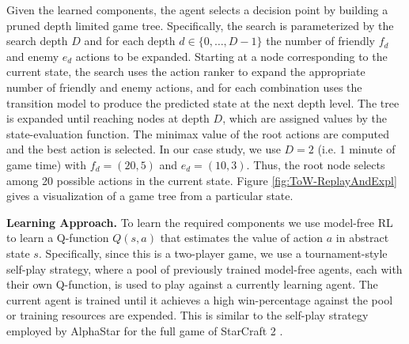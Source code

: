 \documentclass{article}
\begin{document}
Given the learned components, the agent selects a decision point by building a pruned depth limited game tree. Specifically, the search is parameterized by the search depth $D$ and for each depth $d\in \{0,\ldots, D-1\}$ the number of friendly $f_d$ and enemy $e_d$ actions to be expanded. Starting at a node corresponding to the current state, the search uses the action ranker to expand the appropriate number of friendly and enemy actions, and for each combination uses the transition model to produce the predicted state at the next depth level. The tree is expanded until reaching nodes at depth $D$, which are assigned values by the state-evaluation function. The minimax value of the root actions are computed and the best action is selected. In our case study, we use $D=2$ (i.e. 1 minute of game time) with $f_d = (20, 5)$ and $e_d = (10, 3)$. Thus, the root node selects among 20 possible actions in the current state. Figure \ref{fig:ToW-ReplayAndExpl} gives a visualization of a game tree from a particular state. 




{\bf Learning Approach.} To learn the required components we use model-free RL to learn a Q-function $Q(s,a)$ that estimates the value of action $a$ in abstract state $s$. Specifically, since this is a two-player game, we use a tournament-style self-play strategy, where a pool of previously trained model-free agents, each with their own Q-function, is used to play against a currently learning agent. The current agent is trained until it achieves a high win-percentage against the pool or training resources are expended. This is similar to the self-play strategy employed by AlphaStar for the full game of StarCraft 2 \cite{vinyals2019}. 
\end{document}
